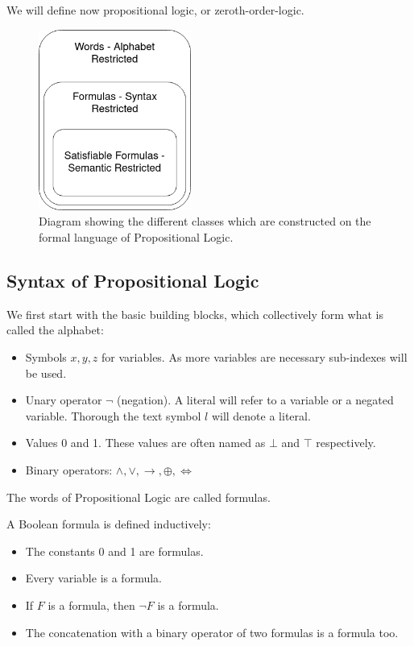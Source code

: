 We will define now propositional logic, or zeroth-order-logic. \\

\begin{figure}[h]
  \begin{center}
    \includegraphics[width=5cm]{figures/sintax2.png}
    \caption{Diagram showing the different classes which are constructed on the formal language of Propositional Logic.}
  \end{center}
\end{figure} 

\subsection{Syntax of Propositional Logic}
We first start with the basic building blocks, which collectively form what is called the alphabet:
\begin{itemize}
\item Symbols $x,y,z$ for variables. As more variables are necessary sub-indexes will be used.
\item Unary operator $\neg$ (negation). A literal will refer to a variable or a negated variable. Thorough the text symbol $l$ will denote a literal. 
  
\item Values 0 and 1. These values are often named as $\bot$ and $\top$ respectively.

\item Binary operators: $\wedge, \vee, \rightarrow, \oplus, \iff $
\end{itemize}


The words of Propositional Logic are called formulas.
\begin{definition}
  A Boolean formula is defined inductively:
  \begin{itemize}
  \item The constants 0 and 1 are formulas.
  \item Every variable is a formula.
  \item If $F$ is a formula, then $\neg  F$ is a formula.
  \item The concatenation with a binary operator of two formulas is a formula too.\\
  \end{itemize}
\end{definition}

